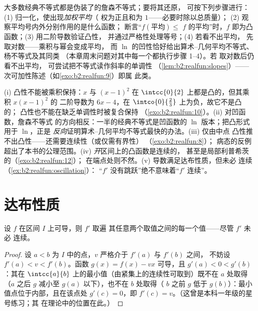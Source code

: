 \begin{method}[求隐藏在不等式背后的凸函数]\label{met:b2:realfun:spotting}
大多数经典不等式都是伪装了的詹森不等式；要将其还原，
可按下列步骤进行：(1) 归一化，使出现\emph{加权平均}（
权为正且和为 $1$——必要时除以总质量）；
(2) 观察平均号内外分别作用的是什么函数；
断言“$f(\text{平均}) \leq$
$f$ 的平均”时，$f$ 即为凸函数；(3) 用二阶导数验证凸性，
并通过严格性处理等号；(4) 若看不出平均，
先取对数——乘积与幂会变成平均，
而 $\ln$ 的凹性恰好给出算术–几何平均不等式、杨不等式及其同类
（本章周末问题对其中每一个都执行步骤 1--4）。若
取对数后仍看不出平均，
可尝试把不等式读作斜率的单调性
（\cref{lem:b2:realfun:slopes}）——
次可加性陈述（如\cref{exo:b2:realfun:9}）即属
此类。
\end{method}

\begin{remark}[常见误区]\label{rem:b2:realfun:pitfalls}
(i) 凸性不能被乘积保持：$x$ 与 $(x - 1)^2$
在 $\intcc{0}{2}$ 上都是凸的，但其乘积 $x(x-1)^2$ 的
二阶导数为 $6x - 4$，在
$\intco{0}{\frac23}$ 上为负，故它不是凸的；
凸性也不能在缺乏单调性时被复合保持
（\cref{exo:b2:realfun:10}）。(ii) 对凹函数，詹森不等式
的方向相反：一半的经典不等式是凹函数的
$\ln$ 版本；把凸形式用于 $\ln$，正是
\emph{反向}证明算术–几何平均不等式最快的办法。(iii) 仅由中点
凸性推不出凸性——还需要连续性（或仅需有界性）
（\cref{exo:b2:realfun:8}）；
病态的反例超出了本书的公理范围。(iv)
\emph{开}区间上的凸函数是连续的，
甚至是局部利普希茨的（\cref{exo:b2:realfun:12}）；
在端点处则不然。(v) 导数满足达布性质，但未必
连续（\cref{ex:b2:realfun:oscillation}）：
“$f'$ 没有跳跃”绝不意味着“$f'$ 连续”。
\end{remark}

\section{达布性质}

\begin{theorem}[达布]\label{thm:b2:realfun:darboux}
设 $f$ 在区间 $I$ 上可导，则 $f'$ 取遍
其任意两个取值之间的每一个值——尽管 $f'$ 未必
连续。
\end{theorem}

\begin{proof}
设 $a < b$ 为 $I$ 中的点，$v$ 严格介于 $f'(a)$ 与 $f'(b)$ 之间，
不妨设 $f'(a) < v < f'(b)$。函数 $g(x) = f(x) - vx$
可导，且 $g'(a) < 0 < g'(b)$：其在
$\intcc{a}{b}$ 上的最小值（由紧集上的连续性可取到）既不在 $a$ 处取得
（$a$ 之后 $g$ 减小至 $g(a)$ 以下），也不在 $b$ 处取得（
$b$ 之前 $g$ 低于 $g(b)$）：最小值点位于内部，且在该点处 $g'(c)
= 0$，即 $f'(c) = v$。（这曾是本科一年级的星号练习；其
在理论中的位置在此。）
\end{proof}

